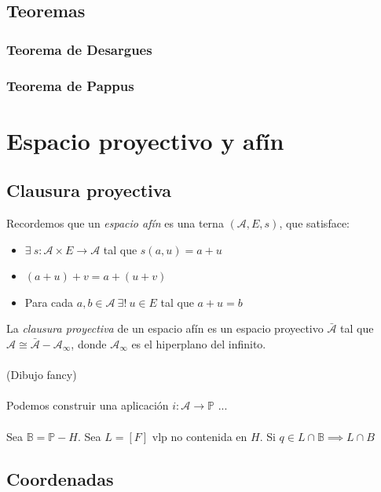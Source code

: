 \documentclass{myclass}
\newcommand{\A}{\mathcal{A}}
\renewcommand{\P}{\mathbb{P}}
\renewcommand{\A}{\mathcal{A}}
\newcommand{\B}{\mathbb{B}}
\begin{document}
\subsection{Teoremas}
\subsubsection{Teorema de Desargues}
\subsubsection{Teorema de Pappus}
 

\section{Espacio proyectivo y afín}
\subsection{Clausura proyectiva}
Recordemos que un \textit{espacio afín} es una terna $(\A, E, s)$, que satisface:
\begin{itemize}
  \item $\exists \ s:\A \times E\to \A$ tal que $s(a, u) = a+u$
  \item $(a+u) + v = a + (u + v)$
  \item Para cada $a, b \in \A \ \exists ! \ u\in E $ tal que $a+ u = b$
\end{itemize}
La \textit{clausura proyectiva} de un espacio afín es un espacio proyectivo $\bar{\A}$ tal que $\A \cong \bar{\A}-\A_\infty$, donde $\A_\infty$ es el hiperplano del infinito. \\
\\
(Dibujo fancy)\\
\\
Podemos construir una aplicación $i: \A \to \P$ ... \\
\\
Sea $\B = \P-H$. Sea $L = [F]$ vlp no contenida en $H$. Si $q\in L\cap \B \implies L\cap B$  

\subsection{Coordenadas}
\end{document}
